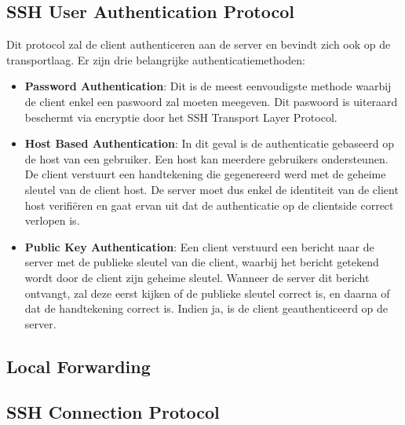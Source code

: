 	\subsection{SSH User Authentication Protocol}
	Dit protocol zal de client authenticeren aan de server en bevindt zich ook op de transportlaag. Er zijn drie belangrijke authenticatiemethoden:
	\begin{itemize}
		\item \textbf{Password Authentication}: Dit is de meest eenvoudigste methode waarbij de client enkel een paswoord zal moeten meegeven. Dit paswoord is uiteraard beschermt via encryptie door het SSH Transport Layer Protocol.
		\item \textbf{Host Based Authentication}: In dit geval is de authenticatie gebaseerd op de host van een gebruiker. Een host kan meerdere gebruikers ondersteunen. De client verstuurt een handtekening die gegenereerd werd met de geheime sleutel van de client host. De server moet dus enkel de identiteit van de client host verifiëren en gaat ervan uit dat de authenticatie op de clientside correct verlopen is.
		
		\item \textbf{Public Key Authentication}: Een client verstuurd een bericht naar de server met de publieke sleutel van die client, waarbij het bericht getekend wordt door de client zijn geheime sleutel. Wanneer de server dit bericht ontvangt, zal deze eerst kijken of de publieke sleutel correct is, en daarna of dat de handtekening correct is. Indien ja, is de client geauthenticeerd op de server.
	\end{itemize}
	\subsection{Local Forwarding}


	\subsection{SSH Connection Protocol}
	
